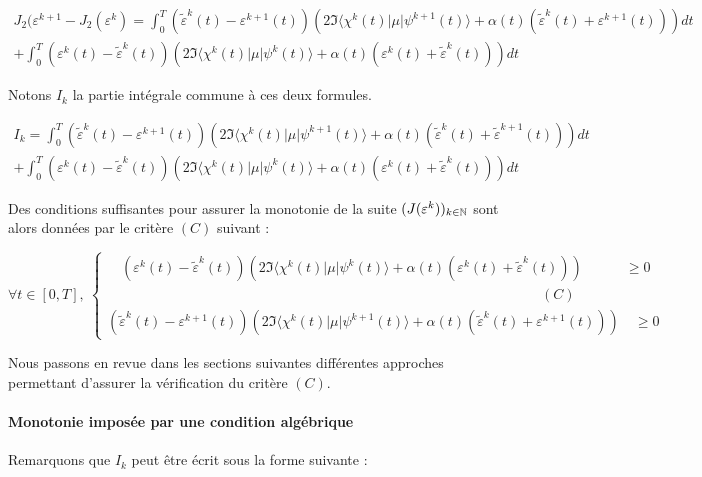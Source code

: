\begin{equation}
\begin{split}
J_2(\varepsilon^{k+1} - J_2(\varepsilon^k) = \int_0^T (\tilde{\varepsilon}^k(t) - \varepsilon^{k+1}(t))(2\Im\langle \chi^k(t)|\mu|\psi^{k+1}(t)\rangle + \alpha(t)(\tilde{\varepsilon}^k(t) + \varepsilon^{k+1}(t)))dt \\
+ \int_0^T(\varepsilon^k(t) - \tilde{\varepsilon}^k(t))(2\Im\langle \chi^k(t)|\mu|\psi^k(t)\rangle + \alpha(t)(\varepsilon^k(t) + \tilde{\varepsilon}^k(t)))dt \quad
\end{split}
\end{equation}

Notons $I_k$ la partie intégrale commune à ces deux formules.

\begin{equation}
\begin{split}
I_k = \int_0^T (\tilde{\varepsilon}^k(t) - \varepsilon^{k+1}(t))(2\Im\langle \chi^k(t)|\mu|\psi^{k+1}(t)\rangle + \alpha(t)(\tilde{\varepsilon}^k(t) + \tilde{\varepsilon}^{k+1}(t)))dt \\
+ \int_0^T(\varepsilon^k(t) - \tilde{\varepsilon}^k(t))(2\Im\langle \chi^k(t)|\mu|\psi^k(t)\rangle + \alpha(t)(\varepsilon^k(t) + \tilde{\varepsilon}^k(t)))dt \quad
\end{split}
\end{equation}

Des conditions suffisantes pour assurer la monotonie de la suite $(J(\varepsilon^k))_{k \in \mathbb N}$ sont alors données par le critère $(C)$ suivant :

\begin{equation*}
\forall t \in [0,T],\ 
\begin{cases}
\quad(\varepsilon^k(t) - \tilde{\varepsilon}^k(t))(2\Im\langle \chi^k(t)|\mu|\psi^k(t)\rangle + \alpha(t)(\varepsilon^k(t) + \tilde{\varepsilon}^k(t))) \quad \quad \quad \geq 0\\
\phantom{11111111111111111111111111111111111111111111111111111111}\quad \quad \quad(C) \\
(\tilde{\varepsilon}^k(t) - \varepsilon^{k+1}(t))(2\Im\langle \chi^k(t)|\mu|\psi^{k+1}(t)\rangle + \alpha(t)(\tilde{\varepsilon}^k(t) + \varepsilon^{k+1}(t))) \quad \geq 0
\end{cases}
\end{equation*}

Nous passons en revue dans les sections suivantes différentes approches permettant d’assurer la vérification du critère $(C)$.

\paragraph*{Monotonie imposée par une condition algébrique}
$ $\\
Remarquons que $I_k$ peut être écrit sous la forme suivante :

